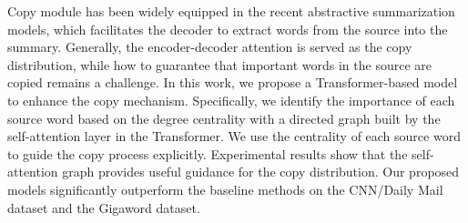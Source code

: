 Copy module has been widely equipped in the recent abstractive summarization models, which facilitates the decoder to extract words from the source into the summary. Generally, the encoder-decoder attention is served as the copy distribution, while how to guarantee that important words in the source are copied remains a challenge. In this work, we propose a Transformer-based model to enhance the copy mechanism. Specifically, we identify the importance of each source word based on the degree centrality with a directed graph built by the self-attention layer in the Transformer. We use the centrality of each source word to  guide the copy process explicitly. Experimental results show that the self-attention graph provides useful guidance for the copy distribution. Our proposed models significantly outperform the baseline methods on the CNN/Daily Mail dataset and the Gigaword dataset.
